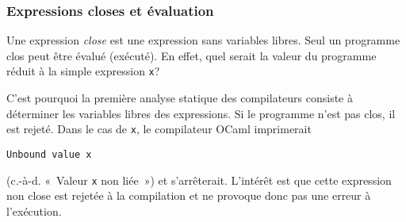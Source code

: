 %
\begin{frame}[containsverbatim]
\frametitle{Expressions closes et évaluation}

Une expression \emph{close} est une expression sans variables
libres. Seul un programme clos peut être évalué (exécuté). En effet,
quel serait la valeur du programme réduit à la simple expression
\verb|x|?

C'est pourquoi la première analyse statique des compilateurs consiste
à déterminer les variables libres des expressions. Si le programme
n'est pas clos, il est rejeté. Dans le cas de \verb|x|, le compilateur
OCaml imprimerait 
\begin{center}
\texttt{Unbound value x}
\end{center}
(c.-à-d. «~Valeur \texttt{x} non liée~») et s'arrêterait. L'intérêt
est que cette expression non close est rejetée à la compilation et ne
provoque donc pas une erreur à l'exécution.

\end{frame}
